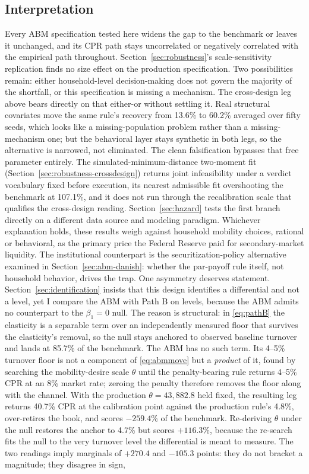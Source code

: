 \documentclass[12pt]{article}
\begin{document}
\subsection{Interpretation}\label{sec:abm-interp}

Every ABM specification tested here widens the gap to the benchmark or leaves it unchanged, and its CPR path stays uncorrelated or negatively correlated with the empirical path throughout. Section~\ref{sec:robustness}'s scale-sensitivity replication finds no size effect on the production specification. Two possibilities remain: either household-level decision-making does not govern the majority of the shortfall, or this specification is missing a mechanism. The cross-design leg above bears directly on that either-or without settling it. Real structural covariates move the same rule's recovery from 13.6\% to 60.2\% averaged over fifty seeds, which looks like a missing-population problem rather than a missing-mechanism one; but the behavioral layer stays synthetic in both legs, so the alternative is narrowed, not eliminated. The clean falsification bypasses that free parameter entirely. The simulated-minimum-distance two-moment fit (Section~\ref{sec:robustness-crossdesign}) returns joint infeasibility under a verdict vocabulary fixed before execution, its nearest admissible fit overshooting the benchmark at 107.1\%, and it does not run through the recalibration scale that qualifies the cross-design reading. Section~\ref{sec:hazard} tests the first branch directly on a different data source and modeling paradigm. Whichever explanation holds, these results weigh against household mobility choices, rational or behavioral, as the primary price the Federal Reserve paid for secondary-market liquidity. The institutional counterpart is the securitization-policy alternative examined in Section~\ref{sec:abm-danish}: whether the par-payoff rule itself, not household behavior, drives the trap. One asymmetry deserves statement. Section~\ref{sec:identification} insists that this design identifies a differential and not a level, yet I compare the ABM with Path B on levels, because the ABM admits no counterpart to the $\beta_1 = 0$ null. The reason is structural: in \eqref{eq:pathB} the elasticity is a separable term over an independently measured floor that survives the elasticity's removal, so the null stays anchored to observed baseline turnover and lands at 85.7\% of the benchmark. The ABM has no such term. Its 4--5\% turnover floor is not a component of \eqref{eq:abmmove} but a \emph{product} of it, found by searching the mobility-desire scale $\theta$ until the penalty-bearing rule returns 4--5\% CPR at an 8\% market rate; zeroing the penalty therefore removes the floor along with the channel. With the production $\theta = 43{,}882.8$ held fixed, the resulting leg returns 40.7\% CPR at the calibration point against the production rule's 4.8\%, over-retires the book, and scores $-259.4$\% of the benchmark. Re-deriving $\theta$ under the null restores the anchor to 4.7\% but scores $+116.3$\%, because the re-search fits the null to the very turnover level the differential is meant to measure. The two readings imply marginals of $+270.4$ and $-105.3$ points: they do not bracket a magnitude; they disagree in sign, 
\end{document}
